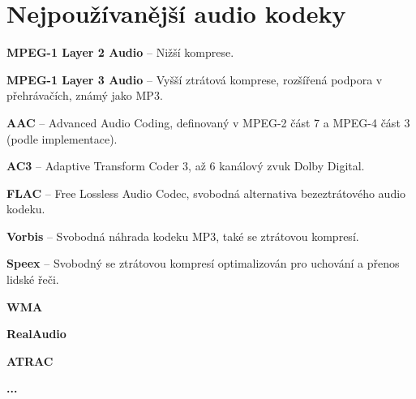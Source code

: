 \section{Nejpoužívanější audio kodeky}
\bitem
\item\textbf{MPEG-1 Layer 2 Audio} -- Nižší komprese.
\item\textbf{MPEG-1 Layer 3 Audio} -- Vyšší ztrátová komprese, rozšířená podpora v přehrávačích, známý jako MP3.
\item\textbf{AAC} -- Advanced Audio Coding, definovaný v MPEG-2 část 7 a MPEG-4 část 3 (podle implementace).
\item\textbf{AC3} -- Adaptive Transform Coder 3, až 6 kanálový zvuk Dolby Digital.
\item\textbf{FLAC} -- Free Lossless Audio Codec, svobodná alternativa bezeztrátového audio kodeku.
\item\textbf{Vorbis} -- Svobodná náhrada kodeku MP3, také se ztrátovou kompresí.
\item\textbf{Speex} -- Svobodný se ztrátovou kompresí optimalizován pro uchování a přenos lidské řeči.
\item\textbf{WMA}
\item\textbf{RealAudio}
\item\textbf{ATRAC}
\item\textbf{...}
\eitem

